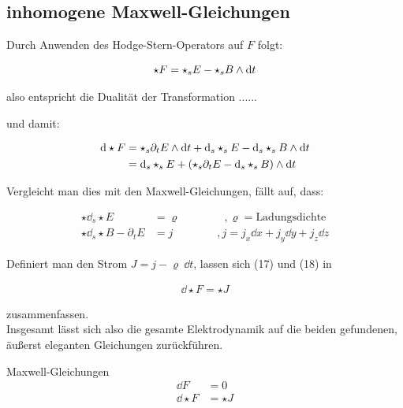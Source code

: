 \subsection{inhomogene Maxwell-Gleichungen}
Durch Anwenden des Hodge-Stern-Operators auf $F$ folgt:

\begin{align}
\star F = \star_s E - \star_s B \wedge \dd t 
\end{align}

also entspricht die Dualität der Transformation ......

und damit:

\begin{align}
\dd \star F &= \star_s \partial_t E  \wedge \dd t + \dd_s \star_s E - \dd_s \star_s B \wedge \dd t \notag \\
				&= \dd_s \star_s E + (\star_s \partial_t E - \dd_s \star_s B) \wedge \dd t 
\end{align}

Vergleicht man dies mit den Maxwell-Gleichungen, fällt auf, dass:

\begin{align}
\star \dd_s \star E &= \varrho \qquad\qquad,\varrho=\text{Ladungsdichte} \\
\star \dd_s\star B - \partial_t E &= j \qquad\qquad ,j=j_x \dd x + j_y \dd y + j_z \dd z
\end{align}

Definiert man den Strom $J=j - \varrho \  \dd t$, lassen sich (17) und (18) in 

\begin{align}
\dd \star F = \star J
\end{align}

zusammenfassen. \\

Insgesamt lässt sich also die gesamte Elektrodynamik auf die beiden gefundenen, äußerst eleganten Gleichungen zurückführen.

\begin{mybox}{Maxwell-Gleichungen}
\begin{align*}
\dd F &= 0 \\
\dd \star F &= \star J
\end{align*}
\end{mybox}
